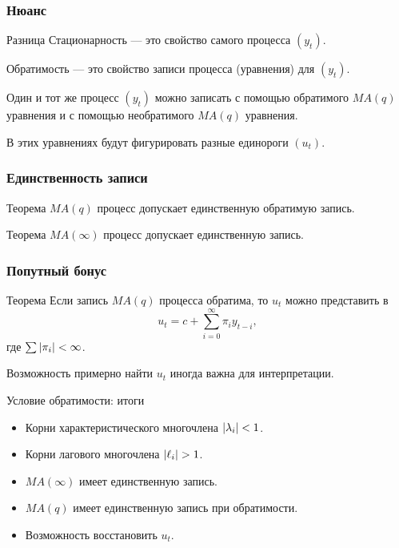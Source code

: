 \begin{frame}
    \frametitle{Нюанс}

    \begin{block}{Разница}
        Стационарность — это свойство самого процесса $(y_t)$.

        Обратимость — это свойство записи процесса (уравнения) для $(y_t)$.
    \end{block}

    \pause
    \alert{Один и тот же} процесс $(y_t)$ можно записать с помощью обратимого $MA(q)$ уравнения
    и с помощью необратимого $MA(q)$ уравнения. 

    \pause
    В этих уравнениях будут фигурировать разные единороги $(u_t)$.
\end{frame}

\begin{frame}
    \frametitle{Единственность записи}

    \begin{block}{Теорема}
        $MA(q)$ процесс допускает единственную обратимую запись. 
    \end{block}

    \pause
    \begin{block}{Теорема}
        $MA(\infty)$ процесс допускает единственную запись. 
    \end{block}    

\end{frame}

\begin{frame}
    \frametitle{Попутный бонус}

    \begin{block}{Теорема}
        Если запись $MA(q)$ процесса обратима, то $u_t$ можно представить в
        \[
            u_t = c + \sum_{i=0}^{\infty} \pi_i y_{t-i},
        \]
        где $\sum \abs{\pi_i} <\infty$.
    \end{block}
    
    \pause
    Возможность примерно найти $u_t$ иногда важна для интерпретации.

\end{frame}




\begin{frame}{Условие обратимости: итоги}

  \begin{itemize}[<+->]
    \item Корни характеристического многочлена $\abs{\lambda_i} < 1$. 
    \item Корни лагового многочлена $\abs{\ell_i} > 1$. 
    \item $MA(\infty)$ имеет единственную запись. 
    \item $MA(q)$ имеет единственную запись при обратимости.
    \item Возможность восстановить $u_t$.
  \end{itemize}
\end{frame}




